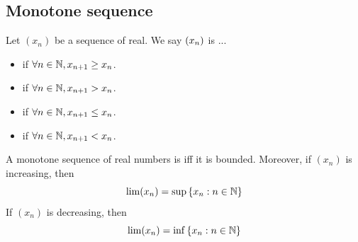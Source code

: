 \documentclass[a4paper,12pt]{article}
\begin{document}
\newpage
\subsection{Monotone sequence}

\begin{definition}
    Let \((x_n)\) be a sequence of real. We say \((x_{n})\) is ...
    \begin{itemize}
        \item {} if \(\forall n\in\mathbb{N}, x_{n+1}\ge x_n\).
        \item {} if \(\forall n\in\mathbb{N}, x_{n+1} > x_n\).
        \item {} if \(\forall n\in\mathbb{N}, x_{n+1}\le x_n\).
        \item {} if \(\forall n\in\mathbb{N}, x_{n+1}< x_n\).\\
    \end{itemize}
\end{definition}

\begin{theorem}
    A monotone sequence of real numbers is  iff it is bounded. 
Moreover, if \((x_n)\) is increasing, then 
\[\lim(x_n) = \sup{\{x_n:n\in\mathbb{N}\}}\]
    If \((x_n)\) is decreasing, then 
    \[\lim(x_n) = \inf{\{x_n:n\in\mathbb{N}\}}\]
\end{theorem}
\end{document}
